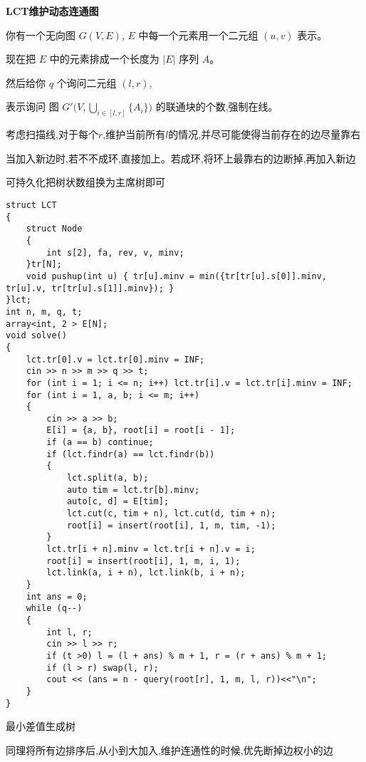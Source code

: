 \documentclass[a4paper, fontset=none]{ctexart}
\begin{document}
\textbf{LCT维护动态连通图}

你有一个无向图 $G( V, E )$, $E$ 中每一个元素用一个二元组 $( u, v )$ 表示。

现在把 $E$ 中的元素排成一个长度为 $|E|$ 序列 $A$。

然后给你 $q$ 个询问二元组 $( l, r )$,

表示询问 图 $ G'\big( V, \mathop{\bigcup}\limits_{ i \in [l, r] } \{A_i\} \big) $ 的联通块的个数,强制在线。

考虑扫描线,对于每个$r$,维护当前所有$l$的情况,并尽可能使得当前存在的边尽量靠右

当加入新边时,若不不成环,直接加上。若成环,将环上最靠右的边断掉,再加入新边

可持久化把树状数组换为主席树即可

\begin{verbatim}
struct LCT
{
    struct Node
    {
        int s[2], fa, rev, v, minv;
    }tr[N];
    void pushup(int u) { tr[u].minv = min({tr[tr[u].s[0]].minv, tr[u].v, tr[tr[u].s[1]].minv}); }
}lct;
int n, m, q, t;
array<int, 2 > E[N];
void solve()
{
    lct.tr[0].v = lct.tr[0].minv = INF;
    cin >> n >> m >> q >> t;
    for (int i = 1; i <= n; i++) lct.tr[i].v = lct.tr[i].minv = INF;
    for (int i = 1, a, b; i <= m; i++)
    {
        cin >> a >> b;
        E[i] = {a, b}, root[i] = root[i - 1];
        if (a == b) continue;
        if (lct.findr(a) == lct.findr(b))
        {
            lct.split(a, b);
            auto tim = lct.tr[b].minv;
            auto[c, d] = E[tim];
            lct.cut(c, tim + n), lct.cut(d, tim + n);
            root[i] = insert(root[i], 1, m, tim, -1);
        }
        lct.tr[i + n].minv = lct.tr[i + n].v = i;
        root[i] = insert(root[i], 1, m, i, 1);
        lct.link(a, i + n), lct.link(b, i + n);
    }
    int ans = 0;
    while (q--)
    {
        int l, r;
        cin >> l >> r;
        if (t >0) l = (l + ans) % m + 1, r = (r + ans) % m + 1;
        if (l > r) swap(l, r);
        cout << (ans = n - query(root[r], 1, m, l, r))<<"\n";
    }
}
\end{verbatim}

最小差值生成树

同理将所有边排序后,从小到大加入,维护连通性的时候,优先断掉边权小的边
\end{document}
